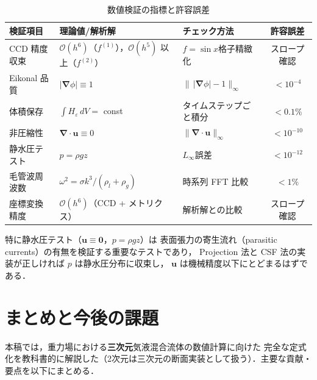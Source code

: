 \documentclass[12pt, a4paper, titlepage]{article}
\newcommand{\jp}[1]{{\normalfont\jpfont #1}}
\newcommand{\bu}{\bm{u}}
\newcommand{\bnabla}{\bm{\nabla}}
\newcommand{\He}{H_\varepsilon}
\newcommand{\Ord}[1]{\mathcal{O}(#1)}
\newcommand{\fp}[1]{f^{(1)}_{#1}}
\newcommand{\fpp}[1]{f^{(2)}_{#1}}
\begin{document}
\begin{table}[h]
\centering
\caption{\jp{数値検証の指標と許容誤差}}
\label{tab:verification}
\begin{tabular}{p{35mm}p{40mm}p{35mm}c}
\toprule
\jp{検証項目} & \jp{理論値/解析解} & \jp{チェック方法} & \jp{許容誤差}\\
\midrule
\jp{CCD 精度収束} & $\Ord{h^6}$\jp{（$\fp{}$），$\Ord{h^5}$ 以上（$\fpp{}$）} & $f=\sin x$\jp{格子精緻化} & \jp{スロープ確認}\\[3pt]
\jp{Eikonal 品質} & $|\bnabla\phi| \equiv 1$ & $\|\,|\bnabla\phi|-1\|_\infty$ & $< 10^{-4}$\\[3pt]
\jp{体積保存} & $\int\He\,dV = $ const & \jp{タイムステップごと積分} & $< 0.1\%$\\[3pt]
\jp{非圧縮性} & $\bnabla\cdot\bu \equiv 0$ & $\|\bnabla\cdot\bu\|_\infty$ & $< 10^{-10}$\\[3pt]
\jp{静水圧テスト} & $p = \rho g z$ & $L_\infty$\jp{誤差} & $< 10^{-12}$\\[3pt]
\jp{毛管波周波数} & $\omega^2 = \sigma k^3/(\rho_l+\rho_g)$ & \jp{時系列 FFT 比較} & $< 1\%$\\[3pt]
\jp{座標変換精度} & $\Ord{h^6}$\jp{（CCD + メトリクス）} & \jp{解析解との比較} & \jp{スロープ確認}\\
\bottomrule
\end{tabular}
\end{table}

\jp{特に静水圧テスト（$\bu\equiv\bm{0}$，$p=\rho g z$）は
表面張力の寄生流れ（parasitic currents）の有無を検証する重要なテストであり，
Projection 法と CSF 法の実装が正しければ $p$ は静水圧分布に収束し，
$\bu$ は機械精度以下にとどまるはずである．}


\section{\jp{まとめと今後の課題}}
\label{sec:conclusion}

\jp{本稿では，重力場における\textbf{三次元}気液混合流体の数値計算に向けた
完全な定式化を教科書的に解説した（2次元は三次元の断面実装として扱う）．主要な貢献・要点を以下にまとめる．}
\end{document}
